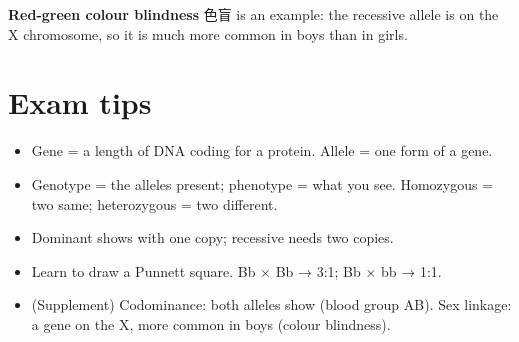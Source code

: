 \documentclass[11pt]{article}
\begin{document}
\textbf{Red-green colour blindness} 色盲 is an example: the recessive allele is on the X chromosome, so it is much more common in boys than in girls.

\section*{Exam tips}

\begin{itemize}
\item Gene = a length of DNA coding for a protein. Allele = one form of a gene.

\item Genotype = the alleles present; phenotype = what you see. Homozygous = two same; heterozygous = two different.

\item Dominant shows with one copy; recessive needs two copies.

\item Learn to draw a Punnett square. Bb × Bb → 3:1; Bb × bb → 1:1.

\item (Supplement) Codominance: both alleles show (blood group AB). Sex linkage: a gene on the X, more common in boys (colour blindness).

\end{itemize}
\end{document}
